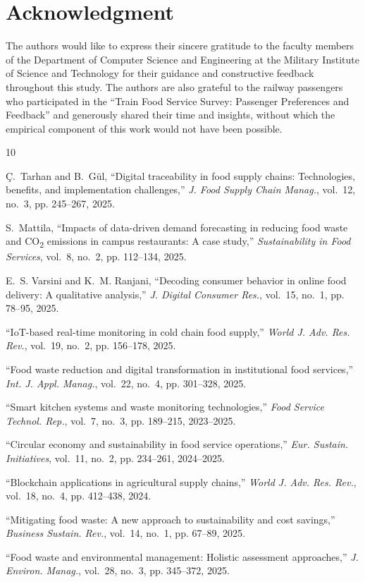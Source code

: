\documentclass[conference]{IEEEtran}
\begin{document}
\section*{Acknowledgment}
The authors would like to express their sincere gratitude to the faculty members of the Department of Computer Science and Engineering at the Military Institute of Science and Technology for their guidance and constructive feedback throughout this study. The authors are also grateful to the railway passengers who participated in the ``Train Food Service Survey: Passenger Preferences and Feedback'' and generously shared their time and insights, without which the empirical component of this work would not have been possible.

\begin{thebibliography}{10}

Ç.~Tarhan and B.~Gül, ``Digital traceability in food supply chains: Technologies, benefits, and implementation challenges,'' \emph{J. Food Supply Chain Manag.}, vol.~12, no.~3, pp. 245--267, 2025.

S.~Mattila, ``Impacts of data-driven demand forecasting in reducing food waste and CO\textsubscript{2} emissions in campus restaurants: A case study,'' \emph{Sustainability in Food Services}, vol.~8, no.~2, pp. 112--134, 2025.

E.~S. Varsini and K.~M. Ranjani, ``Decoding consumer behavior in online food delivery: A qualitative analysis,'' \emph{J. Digital Consumer Res.}, vol.~15, no.~1, pp. 78--95, 2025.

``IoT-based real-time monitoring in cold chain food supply,'' \emph{World J. Adv. Res. Rev.}, vol.~19, no.~2, pp. 156--178, 2025.

``Food waste reduction and digital transformation in institutional food services,'' \emph{Int. J. Appl. Manag.}, vol.~22, no.~4, pp. 301--328, 2025.

``Smart kitchen systems and waste monitoring technologies,'' \emph{Food Service Technol. Rep.}, vol.~7, no.~3, pp. 189--215, 2023--2025.

``Circular economy and sustainability in food service operations,'' \emph{Eur. Sustain. Initiatives}, vol.~11, no.~2, pp. 234--261, 2024--2025.

``Blockchain applications in agricultural supply chains,'' \emph{World J. Adv. Res. Rev.}, vol.~18, no.~4, pp. 412--438, 2024.

``Mitigating food waste: A new approach to sustainability and cost savings,'' \emph{Business Sustain. Rev.}, vol.~14, no.~1, pp. 67--89, 2025.

``Food waste and environmental management: Holistic assessment approaches,'' \emph{J. Environ. Manag.}, vol.~28, no.~3, pp. 345--372, 2025.

\end{thebibliography}
\end{document}
